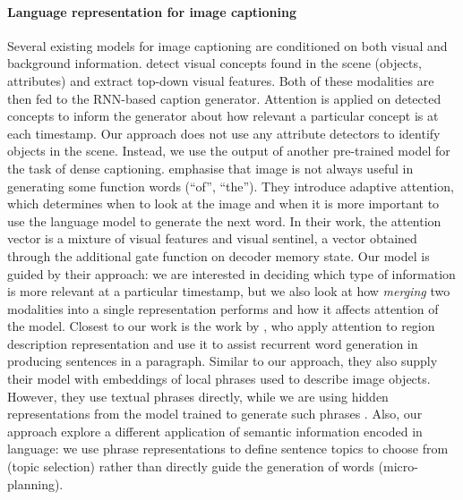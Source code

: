 \documentclass[11pt,a4paper]{article}
\begin{document}
\paragraph{Language representation for image captioning}
Several %
existing models for image captioning are conditioned on both visual and background information.
 detect visual concepts found in the scene (objects, attributes) and extract top-down visual features.
Both of these modalities are then fed to the RNN-based caption generator.
Attention is applied on detected concepts to inform the generator about how relevant a particular concept is at each timestamp.
Our approach does not use any attribute detectors to identify objects in the scene.
Instead, we use the output of another  pre-trained model for the task of dense captioning.
 emphasise that image is not always useful in generating some function words (``of'', ``the'').
They introduce adaptive attention, which determines when to look at the image and when it is more important to use the language model to generate the next word.
In their work, the attention vector is a mixture of visual features and visual sentinel, a vector obtained through the additional gate function on decoder memory state.
Our model %
is guided by their approach: we are interested in deciding which type of information is more relevant at a particular timestamp, but we also look at how \textit{merging} two modalities into a single representation performs and how it affects attention of the model.
Closest to our work is the work by , who apply attention to region description representation and use it to assist recurrent word generation in producing sentences in a paragraph.
Similar to our approach, they also supply their model with embeddings of local phrases used to describe image objects.
However, they use textual phrases directly, while we are using hidden representations from the model trained to generate such phrases \cite{densecap}.
Also, our approach explore %
a different application of semantic information encoded in language: we use phrase representations to define sentence topics to choose from (topic selection) rather than directly guide the generation of words (micro-planning).
\end{document}

